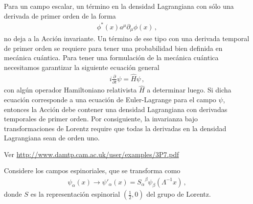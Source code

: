 Para un campo escalar, un término en la densidad Lagrangiana con sólo una derivada de primer orden de la forma
\begin{align}
\label{eq:nolor}
  \phi^*(x)a^\mu\partial_\mu\phi(x)\,,
\end{align}
no deja a la Acción invariante. Un término de ese tipo con una derivada temporal de primer orden se requiere para tener una probabilidad bien definida en mecánica cuántica.
Para tener una formulación de la mecánica cuántica necesitamos garantizar la siguiente ecuación general
\begin{align}
  i\frac{\partial}{\partial t}\psi=\hat{H} \psi\,,  
\end{align}
con algún operador Hamiltoniano relativista  $\widehat{H}$ a determinar luego. Si dicha ecuación corresponde a una ecuación de Euler-Lagrange para el campo $\psi$,
entonces la Acción debe contener una densidad Lagrangiana con derivadas temporales de primer orden. Por consiguiente, la invarianza bajo transformaciones de Lorentz require que todas la derivadas en la densidad Lagrangiana sean de orden uno.

Ver \url{http://www.damtp.cam.ac.uk/user/examples/3P7.pdf}

\begin{frame}
Considere los campos espinoriales, que se transforma como
\begin{align}
\label{eq:184qft}
  \psi_\alpha(x)\to\psi'_\alpha(x)={S_\alpha}^\beta\psi_\beta(\Lambda^{-1}x)\,, 
\end{align}
donde $S$ es la representación espinorial $(\frac{1}{2},0)$ del grupo de Lorentz. 
\end{frame}

